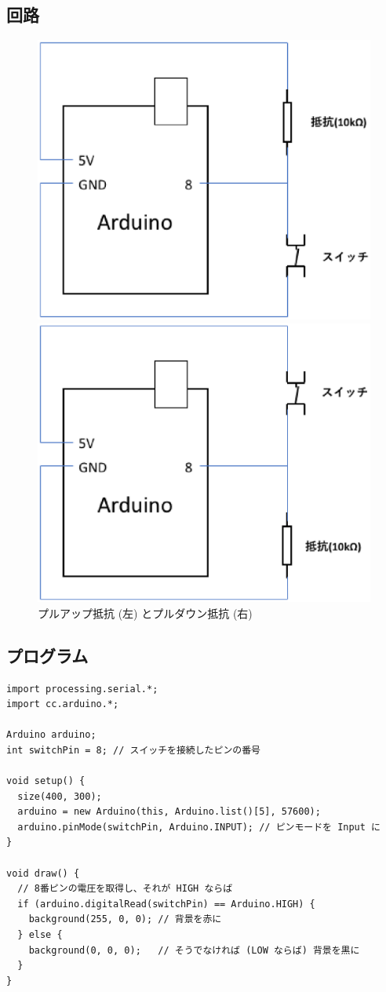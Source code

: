 \documentclass[11pt,a4paper]{jarticle}
\begin{document}

\subsection{回路}
\begin{figure}[htbp]
 \begin{minipage}{0.5\columnwidth}
  \centering
  \includegraphics[width=0.62\columnwidth]{img/pull_up.eps}
 \end{minipage}
 \begin{minipage}{0.5\columnwidth}
  \centering
  \includegraphics[width=0.62\columnwidth]{img/pull_down.eps}
 \end{minipage}
  \caption{プルアップ抵抗 (左) とプルダウン抵抗 (右)}
\end{figure}

\subsection{プログラム}
\begin{lstlisting}
import processing.serial.*;
import cc.arduino.*;

Arduino arduino;
int switchPin = 8; // スイッチを接続したピンの番号
 
void setup() {
  size(400, 300);
  arduino = new Arduino(this, Arduino.list()[5], 57600);
  arduino.pinMode(switchPin, Arduino.INPUT); // ピンモードを Input に
}
 
void draw() {
  // 8番ピンの電圧を取得し、それが HIGH ならば
  if (arduino.digitalRead(switchPin) == Arduino.HIGH) {
    background(255, 0, 0); // 背景を赤に
  } else {
    background(0, 0, 0);   // そうでなければ (LOW ならば) 背景を黒に
  }
}
\end{lstlisting}
\end{document}
